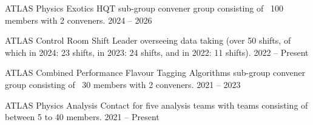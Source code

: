 


\begin{cvhonors}

  \cvhonor
    {ATLAS Physics Exotics HQT sub-group convener} %
    {group consisting of ~100 members with 2 conveners.} %
    {} %
    {2024 -- 2026} %

  \cvhonor
    {ATLAS Control Room Shift Leader} %
    {overseeing data taking (over 50 shifts, of which in 2024: 23 shifts, in 2023: 24 shifts, and in 2022: 11 shifts).} %
    {} %
    {2022 -- Present} %

  \cvhonor
    {ATLAS Combined Performance Flavour Tagging Algorithms
    sub-group convener} %
    {group consisting of ~30 members with 2 conveners.} %
    {} %
    {2021 -- 2023} %

  \cvhonor
    {ATLAS Physics Analysis Contact} %
    {for five analysis teams with teams consisting of between 5 to 40 members.} %
    {} %
    {2021 -- Present} %

\end{cvhonors}


